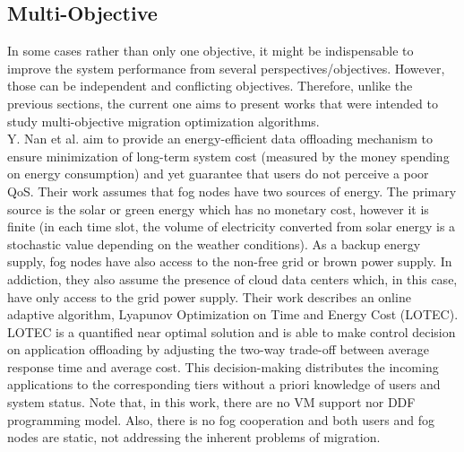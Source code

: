 \subsection{Multi-Objective}\label{sec:multi}
In some cases rather than only one objective, it might be indispensable to improve the system performance from several perspectives/objectives. However, those can be independent and conflicting objectives. Therefore, unlike the previous sections, the current one aims to present works that were intended to study multi-objective migration optimization algorithms.\\
\noindent\tab Y. Nan et al. \cite{nan2017adaptive} aim to provide an energy-efficient data offloading mechanism to ensure minimization of long-term system cost (measured by the money spending on energy consumption) and yet guarantee that users do not perceive a poor QoS. Their work assumes that fog nodes have two sources of energy. The primary source is the solar or green energy which has no monetary cost, however it is finite (in each time slot, the volume of electricity converted from solar energy is a stochastic value depending on the weather conditions). As a backup energy supply, fog nodes have also access to the non-free grid or brown power supply. In addiction, they also assume the presence of cloud data centers which, in this case, have only access to the grid power supply. Their work describes an online adaptive algorithm, Lyapunov Optimization on Time and Energy Cost (LOTEC). LOTEC is a quantified near optimal solution and is able to make control decision on application offloading by adjusting the two-way trade-off between average response time and average cost. This decision-making distributes the incoming applications to the corresponding tiers without a priori knowledge of users and system status. Note that, in this work, there are no VM support nor DDF programming model. Also, there is no fog cooperation and both users and fog nodes are static, not addressing the inherent problems of migration.\\
